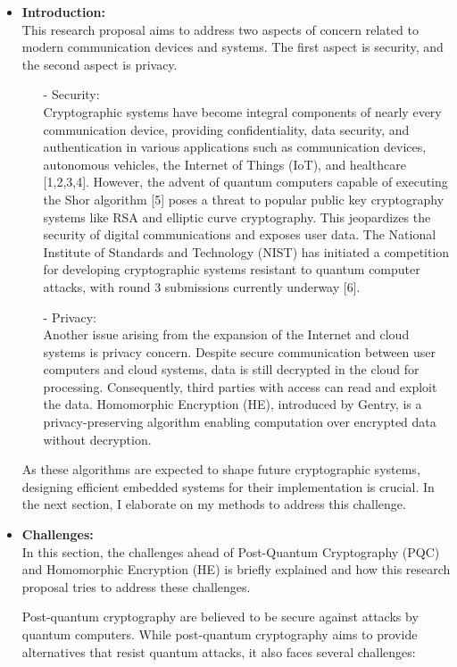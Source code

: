 \begin {itemize}
 \item [$\bullet$] { \bf Introduction:} \vspace{0.5em} \\
This research proposal aims to address two aspects of concern related to modern communication devices and systems. The first aspect is security, and the second aspect is privacy.
\begin{itemize}
\item [-]
Security: \\ Cryptographic systems have become integral components of nearly every communication device, providing confidentiality, data security, and authentication in various applications such as communication devices, autonomous vehicles, the Internet of Things (IoT), and healthcare [1,2,3,4]. However, the advent of quantum computers capable of executing the Shor algorithm [5] poses a threat to popular public key cryptography systems like RSA and elliptic curve cryptography. This jeopardizes the security of digital communications and exposes user data. The National Institute of Standards and Technology (NIST) has initiated a competition for developing cryptographic systems resistant to quantum computer attacks, with round 3 submissions currently underway [6].
\item [-]
Privacy: \\ Another issue arising from the expansion of the Internet and cloud systems is privacy concern. Despite secure communication between user computers and cloud systems, data is still decrypted in the cloud for processing. Consequently, third parties with access can read and exploit the data. Homomorphic Encryption (HE), introduced by Gentry, is a privacy-preserving algorithm enabling computation over encrypted data without decryption.
\end{itemize}
As these algorithms are expected to shape future cryptographic systems, designing efficient embedded systems for their implementation is crucial. In the next section, I elaborate on my methods to address this challenge.
 \item [$\bullet$] { \bf Challenges:} \vspace{0.5em} \\
 In this section, the challenges ahead of  Post-Quantum Cryptography (PQC) and Homomorphic Encryption (HE) is briefly explained and how this research proposal tries to address these challenges.
 
 
 
 Post-quantum cryptography  are believed to be secure against attacks by quantum computers.  While post-quantum cryptography aims to provide alternatives that resist quantum attacks, it also faces several challenges:
\begin{itemize}


\end{itemize}
\end{itemize}
